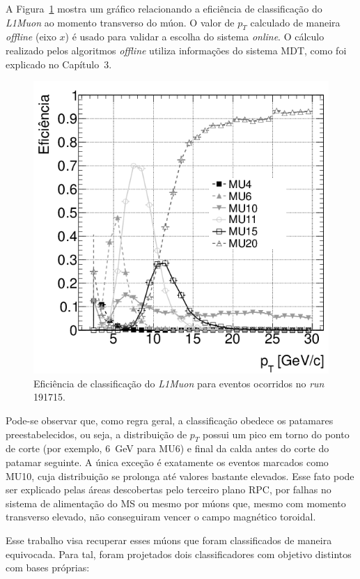 A Figura~\ref{fig:muonrates} mostra um gráfico relacionando a eficiência de
classificação do \emph{L1Muon} ao momento transverso do múon. O valor de $p_T$
calculado de maneira \emph{offline} (eixo $x$) é usado para validar a escolha
do sistema \emph{online}. O cálculo realizado pelos algoritmos \emph{offline}
utiliza informações do sistema MDT, como foi explicado no Capítulo~3.

\begin{figure}[ht!]
    \centering
    \includegraphics[width=12cm]{images/ppm_rpc_turnon_mu10.png}
    \caption{Eficiência de classificação do \emph{L1Muon} para eventos
    ocorridos no \emph{run} 191715.}
    \label{fig:muonrates}
\end{figure}

Pode-se observar que, como regra geral, a classificação obedece os patamares
preestabelecidos, ou seja, a distribuição de $p_T$ possui um pico em torno do
ponto de corte (por exemplo, 6~GeV para MU6) e final da calda antes do corte do
patamar seguinte. A única exceção é exatamente os eventos marcados como MU10,
cuja distribuição se prolonga até valores bastante elevados. Esse fato pode ser
explicado pelas áreas descobertas pelo terceiro plano RPC, por falhas no sistema
de alimentação do MS ou mesmo por múons que, mesmo com momento transverso
elevado, não conseguiram vencer o campo magnético toroidal.

Esse trabalho visa recuperar esses múons que foram classificados de maneira
equivocada. Para tal, foram projetados dois classificadores com objetivo
distintos com bases próprias:

